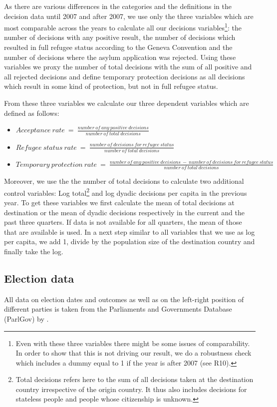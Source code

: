 \documentclass[11pt,a4paper]{scrartcl}
\begin{document}
As there are various differences in the categories and the definitions in the decision data until 2007 and after 2007, we use only the three variables which are most comparable across the years to calculate all our decisions variables\footnote{Even with these three variables there might be some issues of comparability. In order to show that this is not driving our result, we do a robustness check which includes a dummy equal to 1 if the year is after 2007 (see R10).}: the number of decisions with any positive result, the number of decisions which resulted in full refugee status according to the Geneva Convention and the number of decisions where the asylum application was rejected. Using these variables we proxy the number of total decisions with the sum of all positive and all rejected decisions and define temporary protection decisions as all decisions which result in some kind of protection, but not in full refugee status.     

From these three variables we calculate our three dependent variables which are defined as follows:
\begin{itemize}
	\item $Acceptance~rate~=~\frac{number~of~any~positive~decisions}{number~of~total~decisions}$ 
	\item  $Refugee~status~rate~=~\frac{number~of~decisions~for~refugee~status} {number~of~total~decisions}$ 
	\item $Temporary~protection~rate~=~ \frac{number~of~any~positive~decisions~ - ~number~of~decisions~for~refugee~status} {number~of~total~decisions}$ 
\end{itemize}

Moreover, we use the the number of total decisions to calculate two additional control variables: Log total\footnote{Total decisions refers here to the sum of all decisions taken at the destination country irrespective of the origin country. It thus also includes decisions for stateless people and people whose citizenship is unknown.} and log dyadic decisions per capita in the previous year. To get these variables we first calculate the mean of total decisions at destination or the mean of dyadic decisions respectively in the current and the past three quarters. If data is not available for all quarters, the mean of those that are available is used. In a next step similar to all variables that we use as log per capita, we add 1, divide by the population size of the destination country and finally take the log.   

\subsection{Election data}
All data on election dates and outcomes as well as on the left-right position of different parties is taken from the Parliaments and Governments Database (ParlGov) by \textcite{parlgov2016}.
\end{document}
